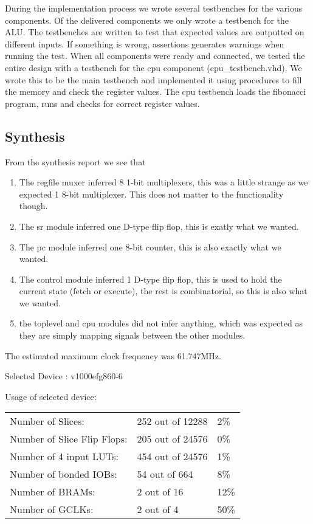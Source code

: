 \documentclass[11pt]{report}
\begin{document}
During the implementation process we wrote several testbenches
for the various components. Of the delivered components we only wrote a testbench
for the ALU. The testbenches are written to test
that expected values are outputted on different inputs. If something is wrong, 
assertions generates warnings when running the test. 
When all components were ready and connected, we tested the entire 
design with a testbench for the cpu component (cpu\_testbench.vhd).  
We wrote this to be the main testbench and implemented it using procedures 
to fill the memory and check the register values. The cpu testbench loads the 
fibonacci program, runs and checks for correct register values.

\subsection*{Synthesis}

From the synthesis report we see that
\begin{enumerate}
\item The regfile muxer inferred 8 1-bit multiplexers, this was a
  little strange as we expected 1 8-bit multiplexer.  This does not
  matter to the functionality though.
\item The sr module inferred one D-type flip flop, this is exatly what
  we wanted.
\item The pc module inferred one 8-bit counter, this is also exactly
  what we wanted.
\item The control module inferred 1 D-type flip flop, this is used to
  hold the current state (fetch or execute), the rest is
  combinatorial, so this is also what we wanted.
\item the toplevel and cpu modules did not infer anything, which was
  expected as they are simply mapping signals between the other
  modules.
\end{enumerate}

The estimated maximum clock frequency was 61.747MHz.

Selected Device : v1000efg860-6 

Usage of selected device:
\begin{table}[h]
  \centering
  \begin{tabular}{|l|l|l|} 
    \hline
    Number of Slices:&252 out of 12288&2\% \\ 
    Number of Slice Flip Flops:&205 out of 24576&0\% \\
    Number of 4 input LUTs:&454 out of 24576&1\% \\
    Number of bonded IOBs:&54 out of 664&8\% \\ 
    Number of BRAMs:&2 out of 16&12\% \\  
    Number of GCLKs:&2 out of 4&50\% \\
    \hline
  \end{tabular}
\end{table}
\end{document}

